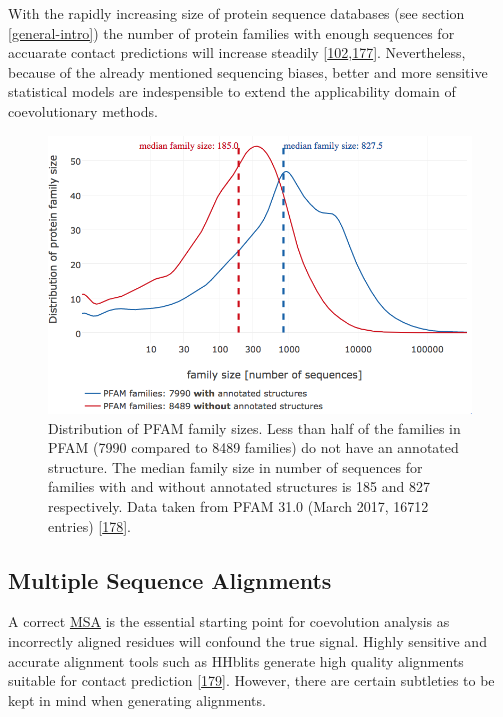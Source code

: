 \documentclass[11pt,a4paper,twoside]{book}
\theoremstyle{definition}
\theoremstyle{definition}
\theoremstyle{remark}
\begin{document}
With the rapidly increasing size of protein sequence databases (see
section \ref{general-intro}) the number of protein families with enough
sequences for accuarate contact predictions will increase steadily
{[}\protect\hyperlink{ref-Kamisetty2013}{102},\protect\hyperlink{ref-TheUniProtConsortium2013}{177}{]}.
Nevertheless, because of the already mentioned sequencing biases, better
and more sensitive statistical models are indespensible to extend the
applicability domain of coevolutionary methods.








\begin{figure}

{\centering \includegraphics[width=0.9\linewidth]{img/pfam_pdb_notitle} 

}

\caption{Distribution of PFAM family sizes. Less than half of
the families in PFAM (7990 compared to 8489 families) do not have an
annotated structure. The median family size in number of sequences for
families with and without annotated structures is 185 and 827
respectively. Data taken from PFAM 31.0 (March 2017, 16712 entries)
{[}\protect\hyperlink{ref-Finn2016}{178}{]}.}\label{fig:pfam}
\end{figure}

\subsection{Multiple Sequence
Alignments}\label{multiple-sequence-alignments}

A correct \protect\hyperlink{abbrev}{MSA} is the essential starting
point for coevolution analysis as incorrectly aligned residues will
confound the true signal. Highly sensitive and accurate alignment tools
such as HHblits generate high quality alignments suitable for contact
prediction {[}\protect\hyperlink{ref-Remmert2012}{179}{]}. However,
there are certain subtleties to be kept in mind when generating
alignments.
\end{document}
